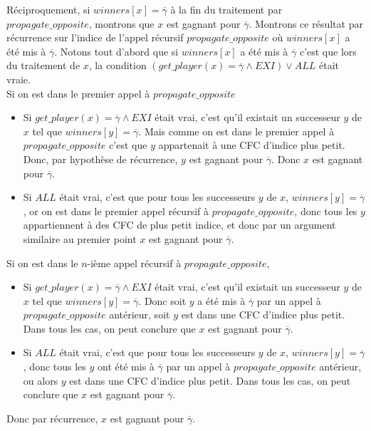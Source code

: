 \documentclass[10pt,a4paper]{article}
\begin{document}
\bigskip
Réciproquement, si $winners[x] = \overline{\gamma}$ à la fin du traitement par $propagate\_opposite$, montrons que $x$ est gagnant pour $\overline{\gamma}$. Montrons ce résultat par récurrence sur l'indice de l'appel récursif $propagate\_opposite$ où $winners[x]$ a été mis à $\overline{\gamma}$. Notons tout d'abord que si $winners[x]$ a été mis à $\overline{\gamma}$ c'est que lors du traitement de $x$, la condition $(get\_player(x) = \overline{\gamma} \land EXI) \lor ALL $ était vraie.\\
Si on est dans le premier appel à $propagate\_opposite$
\begin{itemize}
	\item Si $get\_player(x) = \overline{\gamma} \land EXI$ était vrai, c'est qu'il existait un successeur $y$ de $x$ tel que $winners[y] = \overline{\gamma}$. Mais comme on est dans le premier appel à $propagate\_opposite$ c'est que $y$ appartenait à une CFC d'indice plus petit. Donc, par hypothèse de récurrence, $y$ est gagnant pour $\overline{\gamma}$. Donc $x$ est gagnant pour $\overline{\gamma}$.
	\item Si $ALL$ était vrai, c'est que pour tous les successeurs $y$ de $x$, $winners[y] = \overline{\gamma}$, or on est dans le premier appel récursif à $propagate\_opposite$, donc tous les $y$ appartiennent à des CFC de plus petit indice, et donc par un argument similaire au premier point $x$ est gagnant pour $\overline{\gamma}$.
\end{itemize}
Si on est dans le $n$-ième appel récursif à $propagate\_opposite$,
\begin{itemize}
	\item Si $get\_player(x) = \overline{\gamma} \land EXI$ était vrai, c'est qu'il existait un successeur $y$ de $x$ tel que $winners[y] = \overline{\gamma}$. Donc soit $y$ a été mis à $\overline{\gamma}$ par un appel à $propagate\_opposite$ antérieur, soit $y$ est dans une CFC d'indice plus petit. Dans tous les cas, on peut conclure que $x$ est gagnant pour $\overline{\gamma}$.
	\item Si $ALL$ était vrai, c'est que pour tous les successeurs $y$ de $x$, $winners[y] = \overline{\gamma}$, donc tous les $y$ ont été mis à $\overline{\gamma}$ par un appel à $propagate\_opposite$ antérieur, ou alors $y$ est dans une CFC d'indice plus petit. Dans tous les cas, on peut conclure que $x$ est gagnant pour $\overline{\gamma}$.
\end{itemize}

Donc par récurrence, $x$ est gagnant  pour $\overline{\gamma}$.
\end{document}
